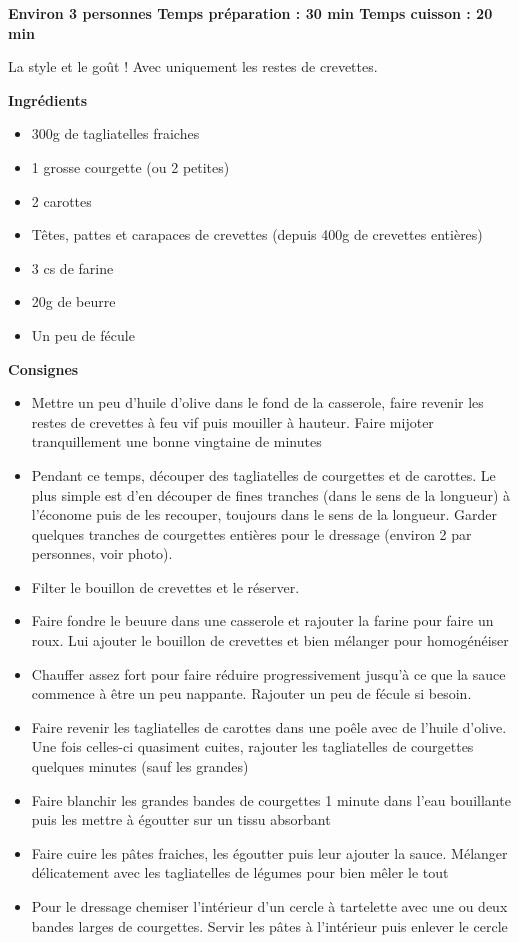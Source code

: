 \documentclass[]{book}
\providecommand{\tightlist}{%
  \setlength{\itemsep}{0pt}\setlength{\parskip}{0pt}}
\begin{document}
\begin{salebox}
\textbf{Environ 3 personnes \textbar{} Temps préparation : 30 min
\textbar{} Temps cuisson : 20 min}

La style et le goût ! Avec uniquement les restes de crevettes.
\end{salebox}

\textbf{Ingrédients}

\begin{itemize}
\tightlist
\item
  300g de tagliatelles fraiches
\item
  1 grosse courgette (ou 2 petites)
\item
  2 carottes
\item
  Têtes, pattes et carapaces de crevettes (depuis 400g de crevettes entières)
\item
  3 cs de farine
\item
  20g de beurre
\item
  Un peu de fécule
\end{itemize}

\textbf{Consignes}

\begin{itemize}
\tightlist
\item
  Mettre un peu d'huile d'olive dans le fond de la casserole, faire revenir les restes de crevettes à feu vif puis mouiller à hauteur. Faire mijoter tranquillement une bonne vingtaine de minutes
\item
  Pendant ce temps, découper des tagliatelles de courgettes et de carottes. Le plus simple est d'en découper de fines tranches (dans le sens de la longueur) à l'économe puis de les recouper, toujours dans le sens de la longueur. Garder quelques tranches de courgettes entières pour le dressage (environ 2 par personnes, voir photo).
\item
  Filter le bouillon de crevettes et le réserver.
\item
  Faire fondre le beuure dans une casserole et rajouter la farine pour faire un roux. Lui ajouter le bouillon de crevettes et bien mélanger pour homogénéiser
\item
  Chauffer assez fort pour faire réduire progressivement jusqu'à ce que la sauce commence à être un peu nappante. Rajouter un peu de fécule si besoin.
\item
  Faire revenir les tagliatelles de carottes dans une poêle avec de l'huile d'olive. Une fois celles-ci quasiment cuites, rajouter les tagliatelles de courgettes quelques minutes (sauf les grandes)
\item
  Faire blanchir les grandes bandes de courgettes 1 minute dans l'eau bouillante puis les mettre à égoutter sur un tissu absorbant
\item
  Faire cuire les pâtes fraiches, les égoutter puis leur ajouter la sauce. Mélanger délicatement avec les tagliatelles de légumes pour bien mêler le tout
\item
  Pour le dressage chemiser l'intérieur d'un cercle à tartelette avec une ou deux bandes larges de courgettes. Servir les pâtes à l'intérieur puis enlever le cercle
\end{itemize}
\end{document}
